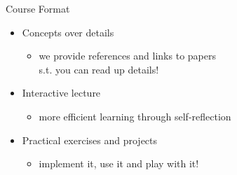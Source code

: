 \documentclass[aspectratio=169, handout]{../latex_main/tntbeamer}  %
\begin{document}
\begin{frame}[c]{Course Format}

\begin{itemize}
	\item Concepts over details
	\begin{itemize}
	  \item we provide references and links to papers\\ s.t. you can read up details!
	\end{itemize}
	\smallskip
	\item Interactive lecture
	\begin{itemize}
	  \item more efficient learning through self-reflection
	\end{itemize}
	\smallskip
	\item Practical exercises and projects
	\begin{itemize}
	  \item implement it, use it and play with it!
	\end{itemize}
\end{itemize}

\end{frame}
\end{document}
